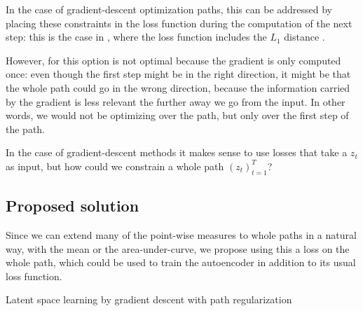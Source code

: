 \documentclass[../main.tex]{subfiles}
\begin{document}
In the case of gradient-descent optimization paths, this can be addressed by placing these constraints in the loss function during the computation of the next step: this is the case in \revise{}, where the loss function includes the $L_1$ distance \cite{joshiRealistic2019}.

However, for \ls{} this option is not optimal because the gradient is only computed once: even though the first step might be in the right direction, it might be that the whole path could go in the wrong direction, because the information carried by the gradient is less relevant the further away we go from the input.
In other words, we would not be optimizing over the path, but only over the first step of the path.

In the case of gradient-descent methods it makes sense to use losses that take a $z_t$ as input, but how could we constrain a whole path $(z_t)_{t=1}^T$?

\subsection{Proposed solution}

Since we can extend many of the point-wise measures to whole paths in a natural way, \eg{} with the mean or the area-under-curve, we propose using this a loss on the whole path, which could be used to train the autoencoder in addition to its usual loss function.

\begin{algorithm}
\caption{Latent space learning by gradient descent with path regularization}
\end{algorithm}
\end{document}
